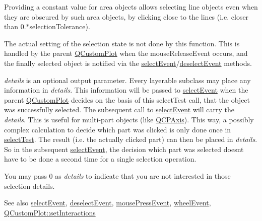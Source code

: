 Providing a constant value for area objects allows selecting line objects even when they are obscured by such area objects, by clicking close to the lines (i.\+e. closer than 0.$\ast$selection\+Tolerance).

The actual setting of the selection state is not done by this function. This is handled by the parent \hyperlink{class_q_custom_plot}{Q\+Custom\+Plot} when the mouse\+Release\+Event occurs, and the finally selected object is notified via the \hyperlink{class_q_c_p_abstract_item_aa4b969c58797f39c9c0b6c07c7869d17}{select\+Event}/\hyperlink{class_q_c_p_abstract_item_af9093798cb07a861dcc73f93ca16c0c1}{deselect\+Event} methods.

{\itshape details} is an optional output parameter. Every layerable subclass may place any information in {\itshape details}. This information will be passed to \hyperlink{class_q_c_p_abstract_item_aa4b969c58797f39c9c0b6c07c7869d17}{select\+Event} when the parent \hyperlink{class_q_custom_plot}{Q\+Custom\+Plot} decides on the basis of this select\+Test call, that the object was successfully selected. The subsequent call to \hyperlink{class_q_c_p_abstract_item_aa4b969c58797f39c9c0b6c07c7869d17}{select\+Event} will carry the {\itshape details}. This is useful for multi-\/part objects (like \hyperlink{class_q_c_p_axis}{Q\+C\+P\+Axis}). This way, a possibly complex calculation to decide which part was clicked is only done once in \hyperlink{class_q_c_p_item_pixmap_a65d1ede7bb479b90d40186d083071947}{select\+Test}. The result (i.\+e. the actually clicked part) can then be placed in {\itshape details}. So in the subsequent \hyperlink{class_q_c_p_abstract_item_aa4b969c58797f39c9c0b6c07c7869d17}{select\+Event}, the decision which part was selected doesn\textquotesingle{}t have to be done a second time for a single selection operation.

You may pass 0 as {\itshape details} to indicate that you are not interested in those selection details.

\begin{DoxySeeAlso}{See also}
\hyperlink{class_q_c_p_abstract_item_aa4b969c58797f39c9c0b6c07c7869d17}{select\+Event}, \hyperlink{class_q_c_p_abstract_item_af9093798cb07a861dcc73f93ca16c0c1}{deselect\+Event}, \hyperlink{class_q_c_p_layerable_af6567604818db90f4fd52822f8bc8376}{mouse\+Press\+Event}, \hyperlink{class_q_c_p_layerable_a47dfd7b8fd99c08ca54e09c362b6f022}{wheel\+Event}, \hyperlink{class_q_custom_plot_a5ee1e2f6ae27419deca53e75907c27e5}{Q\+Custom\+Plot\+::set\+Interactions} 
\end{DoxySeeAlso}


